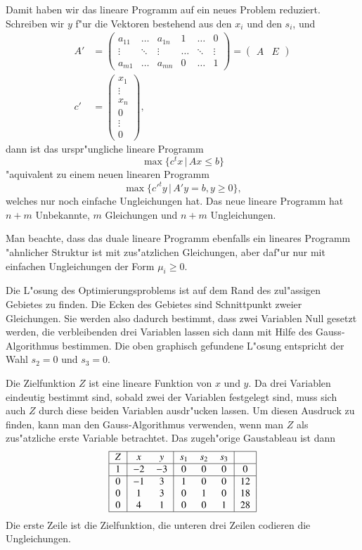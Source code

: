 Damit haben wir das lineare Programm auf ein neues Problem reduziert.
Schreiben wir $y$ f"ur die Vektoren bestehend aus den $x_i$ und den $s_i$,
und
\begin{align*}
A'&=\begin{pmatrix}
a_{11}&\dots &a_{1n}&1&\dots&0\\
\vdots&\ddots&\vdots&\dots&\ddots&\vdots\\
a_{m1}&\dots &a_{mn}&0&\dots&1
\end{pmatrix}
=\begin{pmatrix}A&E\end{pmatrix}
\\
c'&=\begin{pmatrix}x_1\\\vdots\\x_n\\0\\\vdots\\0\end{pmatrix},
\end{align*}
dann ist das urspr"ungliche lineare Programm
\[
\max\{ c^tx\,|\, Ax\le b\}
\]
"aquivalent zu einem neuen linearen Programm
\[
\max\{ c'^ty\,|\, A'y=b, y\ge 0\},
\]
welches nur noch einfache Ungleichungen hat.
Das neue lineare Programm hat $n+m$ Unbekannte, $m$ Gleichungen
und $n+m$ Ungleichungen.

Man beachte, dass das duale lineare Programm
ebenfalls ein lineares Programm "ahnlicher Struktur ist mit zus"atzlichen
Gleichungen, aber daf"ur nur mit einfachen Ungleichungen der Form
$\mu_i\ge 0$.

Die L"osung des Optimierungsproblems ist auf dem Rand des
zul"assigen Gebietes zu finden.
Die Ecken des Gebietes sind Schnittpunkt zweier Gleichungen.
Sie werden also dadurch bestimmt, dass zwei Variablen 
Null gesetzt werden, die verbleibenden drei Variablen
lassen sich dann mit Hilfe des Gauss-Algorithmus bestimmen.
Die oben graphisch gefundene L"osung entspricht der
Wahl $s_2=0$ und $s_3=0$.

Die Zielfunktion $Z$ ist eine lineare Funktion von $x$ und $y$.
Da drei Variablen eindeutig bestimmt sind, sobald zwei der
Variablen festgelegt sind, muss sich auch $Z$ durch diese beiden
Variablen ausdr"ucken lassen.
Um diesen Ausdruck zu finden,
kann man den Gauss-Algorithmus
verwenden, wenn man $Z$ als zus"atzliche erste Variable betrachtet.
Das zugeh"orige Gaustableau ist dann
\[
\begin{tabular}{|>{$}c<{$}|>{$}c<{$}>{$}c<{$}|>{$}c<{$}>{$}c<{$}>{$}c<{$}|>{$}c<{$}|}
\hline
Z&x&y&s_1&s_2&s_3& \\
\hline
1&-2&-3& 0& 0& 0& 0\\
\hline
0&-1& 3& 1& 0& 0&12\\
0& 1& 3& 0& 1& 0&18\\
0& 4& 1& 0& 0& 1&28\\
\hline
\end{tabular}
\]
Die erste Zeile ist die Zielfunktion, die unteren drei Zeilen codieren die
Ungleichungen.

